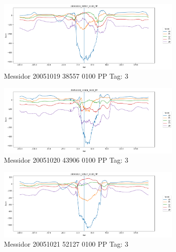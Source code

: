 \begin{figure}[ht!]
	\centering
	\begin{subfigure}[b]{ 0.85\textwidth}
		\centering
		\includegraphics[width=\textwidth]{Figures/chapter_stability/20051019_38557_0100_PP/h/scores.png}
		\caption{Messidor 20051019 38557 0100 PP Tag: 3}				
	\end{subfigure}	
	\begin{subfigure}[b]{ 0.85\textwidth}
		\centering
		\includegraphics[width=\textwidth]{Figures/chapter_stability/20051020_43906_0100_PP/h/scores.png}
		\caption{Messidor 20051020 43906 0100 PP Tag: 3}				
	\end{subfigure}	
	\begin{subfigure}[b]{ 0.85\textwidth}
		\centering
		\includegraphics[width=\textwidth]{Figures/chapter_stability/20051021_52127_0100_PP/h/scores.png}
		\caption{Messidor 20051021 52127 0100 PP Tag: 3}				
	\end{subfigure}	
	\begin{subfigure}[b]{ 0.85\textwidth}

\end{subfigure}
\end{figure}
